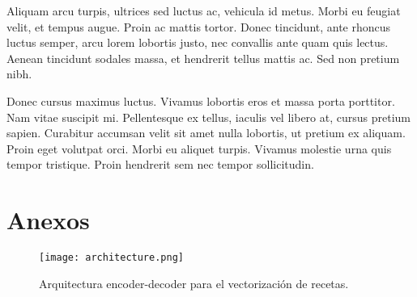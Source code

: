 \documentclass[
	a4paper, %
	10pt, %
	unnumberedsections, %
	twoside, %
]{LTJournalArticle}
\begin{document}
Aliquam arcu turpis, ultrices sed luctus ac, vehicula id metus. Morbi eu feugiat velit, et tempus augue. Proin ac mattis tortor. Donec tincidunt, ante rhoncus luctus semper, arcu lorem lobortis justo, nec convallis ante quam quis lectus. Aenean tincidunt sodales massa, et hendrerit tellus mattis ac. Sed non pretium nibh. 

Donec cursus maximus luctus. Vivamus lobortis eros et massa porta porttitor. Nam vitae suscipit mi. Pellentesque ex tellus, iaculis vel libero at, cursus pretium sapien. Curabitur accumsan velit sit amet nulla lobortis, ut pretium ex aliquam. Proin eget volutpat orci. Morbi eu aliquet turpis. Vivamus molestie urna quis tempor tristique. Proin hendrerit sem nec tempor sollicitudin.


\printbibliography %


\section{Anexos}

\begin{figure*}
	\texttt{[image: architecture.png]}
	\caption{Arquitectura encoder-decoder para el vectorización de recetas.}
	\label{fig:encoder_decoder}
\end{figure*}
\end{document}
